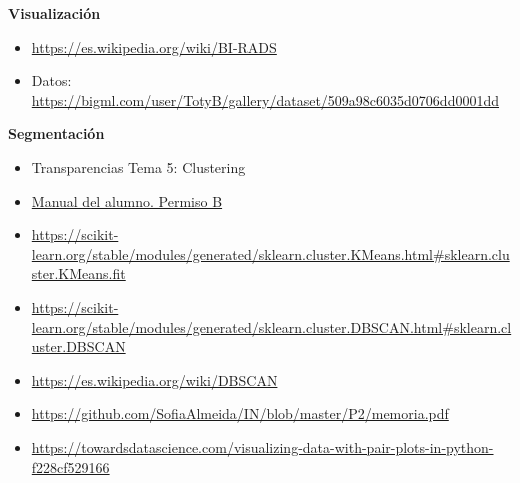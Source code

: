\documentclass[a4]{article}
\begin{document}
\textbf{Visualización}
\begin{itemize}
\item \href{https://es.wikipedia.org/wiki/BI-RADS}{https://es.wikipedia.org/wiki/BI-RADS}
\item Datos: \href{https://bigml.com/user/TotyB/gallery/dataset/509a98c6035d0706dd0001dd}{https://bigml.com/user/TotyB/gallery/dataset/509a98c6035d0706dd0001dd}
\end{itemize}
\textbf{Segmentación}
\begin{itemize}
\item Transparencias Tema 5: Clustering
\item \href{https://www.todostuslibros.com/libros/manual-del-alumno-permiso-b-facilauto_978-84-09-08551-4}{Manual del alumno. Permiso B}
\item \href{https://scikit-learn.org/stable/modules/generated/sklearn.cluster.KMeans.html\#sklearn.cluster.KMeans.fit}{https://scikit-learn.org/stable/modules/generated/sklearn.cluster.KMeans.html\#sklearn.cluster.KMeans.fit}
\item \href{https://scikit-learn.org/stable/modules/generated/sklearn.cluster.DBSCAN.html\#sklearn.cluster.DBSCAN}{https://scikit-learn.org/stable/modules/generated/sklearn.cluster.DBSCAN.html\#sklearn.cluster.DBSCAN}
\item \href{https://es.wikipedia.org/wiki/DBSCAN}{https://es.wikipedia.org/wiki/DBSCAN}
\item \href{https://github.com/SofiaAlmeida/IN/blob/master/P2/memoria.pdf}{https://github.com/SofiaAlmeida/IN/blob/master/P2/memoria.pdf}
\item \href{https://towardsdatascience.com/visualizing-data-with-pair-plots-in-python-f228cf529166}{https://towardsdatascience.com/visualizing-data-with-pair-plots-in-python-f228cf529166}
\end{itemize}
\end{document}
